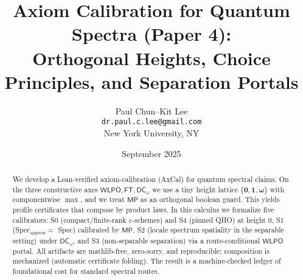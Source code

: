 \documentclass[11pt]{article}
\title{Axiom Calibration for Quantum Spectra (Paper 4):\\
Orthogonal Heights, Choice Principles, and Separation Portals}
\author{Paul Chun--Kit Lee\\
\texttt{dr.paul.c.lee@gmail.com}\\
New York University, NY}
\date{September 2025}
\newcommand{\WLPO}{\mathsf{WLPO}}
\newcommand{\FT}{\mathsf{FT}}
\newcommand{\DCw}{\mathsf{DC}_{\omega}}
\newcommand{\MP}{\mathsf{MP}}
\newcommand{\hzero}{\mathbf{0}}
\newcommand{\hone}{\mathbf{1}}
\newcommand{\homega}{\boldsymbol{\omega}}
\theoremstyle{plain}
\theoremstyle{definition}
\theoremstyle{remark}
\begin{document}
\maketitle

\begin{abstract}
We develop a Lean-verified axiom-calibration (AxCal) for quantum spectral claims.
On the three constructive axes \(\WLPO,\FT,\DCw\) we use a tiny height lattice
\(\{\hzero,\hone,\homega\}\) with componentwise \(\max\), and we treat \(\MP\) as an
orthogonal boolean guard. This yields profile certificates that compose by product
laws. In this calculus we formalize five calibrators:
S0 (compact/finite-rank \(\varepsilon\)-schemes) and S4 (pinned QHO) at height \(0\),
S1 (Spec\(_{\mathrm{approx}}=\) Spec) calibrated by \(\MP\), S2 (locale spectrum spatiality
in the separable setting) under \(\DCw\), and S3 (non-separable separation) via a
route-conditional \(\WLPO\) portal. All artifacts are mathlib-free, zero-sorry, and
reproducible; composition is mechanized (automatic certificate folding). The result
is a machine-checked ledger of foundational cost for standard spectral routes.
\end{abstract}

\tableofcontents

\noindent{}
\end{document}
